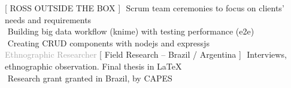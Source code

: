 \begin{cvtable}
%
	{[ R{\scriptsize OSS} O{\scriptsize UTSIDE THE} B{\scriptsize OX} ]}{
        \textperiodcentered $ $ Scrum team ceremonies to focus on clients' needs and requirements \\        
        \textperiodcentered $ $ Building big data workflow (knime) with testing performance (e2e) \\        
        \textperiodcentered $ $ Creating CRUD components with nodejs and expressjs \\
        }  
% 
	{%
	\textcolor{darkgray}{%
    Ethnographic Researcher
	}}
	{
    [ Field Research -- Brazil / Argentina ]%
	}
	{
        \textperiodcentered $ $ Interviews, ethnographic observation. Final thesis in \LaTeX \\
        \textperiodcentered $ $ Research grant granted in Brazil, by CAPES \\ 
	\wt{%
}}
\end{cvtable}

